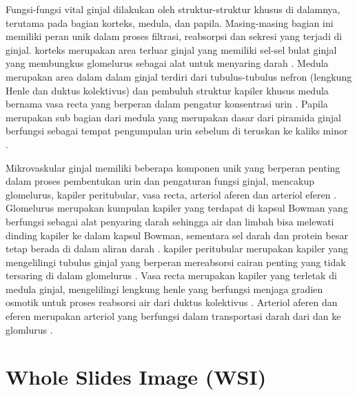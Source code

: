 \noindent Fungsi-fungsi vital ginjal dilakukan oleh struktur-struktur khusus di dalamnya, terutama pada bagian korteks, medula, dan papila. Masing-masing bagian ini memiliki peran unik dalam proses filtrasi, reabsorpsi dan sekresi yang terjadi di ginjal. korteks merupakan area terluar ginjal yang memiliki sel-sel bulat ginjal yang membungkus glomelurus sebagai alat untuk menyaring darah \cite{gopalan_renal_2022,mescher_junqueiras_2021}. Medula merupakan area dalam dalam ginjal terdiri dari tubulus-tubulus nefron (lengkung Henle dan duktus kolektivus) dan pembuluh struktur kapiler khusus medula bernama vasa recta yang berperan dalam pengatur konsentrasi urin \cite{haug_multi-omic_2022}. Papila merupakan sub bagian dari medula yang merupakan dasar dari piramida ginjal berfungsi sebagai tempat pengumpulan urin sebelum di teruskan ke kaliks minor \cite{sabate_arroyo_relationship_2020}.

\noindent Mikrovaskular ginjal memiliki beberapa komponen unik yang berperan penting dalam proses pembentukan urin dan pengaturan fungsi ginjal, mencakup glomelurus, kapiler peritubular, vasa recta, arteriol aferen dan arteriol eferen \cite{mescher_junqueiras_2021}. Glomelurus merupakan kumpulan kapiler yang terdapat di kapsul Bowman yang berfungsi sebagai alat penyaring darah sehingga air dan limbah bisa melewati dinding kapiler ke dalam kapsul Bowman, sementara sel darah dan protein besar tetap berada di dalam aliran darah \cite{luxen_unique_2023}. kapiler peritubular merupakan kapiler yang mengelilingi tubulus ginjal yang berperan mereabsorsi cairan penting yang tidak tersaring di dalam glomelurus \cite{savedchuk_targeting_2023}. Vasa recta merupakan kapiler yang terletak di medula ginjal, mengelilingi  lengkung henle yang berfungsi menjaga gradien osmotik untuk proses reabsorsi air dari duktus kolektivus \cite{goligorsky_emerging_2022}. Arteriol aferen dan eferen merupakan arteriol  yang berfungsi dalam transportasi darah dari dan ke glomlurus \cite{ergin_kidney_2021}.



\section{Whole Slides Image (WSI)}

